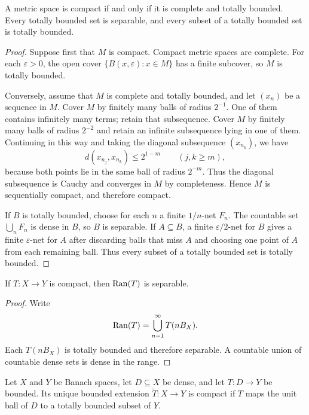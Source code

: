 \begin{notelemma}
A metric space is compact if and only if it is complete and totally bounded.
Every totally bounded set is separable, and every subset of a totally bounded
set is totally bounded.
\end{notelemma}

\begin{proof}
Suppose first that $M$ is compact.  Compact metric spaces are complete.  For
each $\varepsilon>0$, the open cover
\(
  \{B(x,\varepsilon):x\in M\}
\)
has a finite subcover, so $M$ is totally bounded.

Conversely, assume that $M$ is complete and totally bounded, and let
$(x_n)$ be a sequence in $M$.  Cover $M$ by finitely many balls of radius
$2^{-1}$.  One of them contains infinitely many terms; retain that
subsequence.  Cover $M$ by finitely many balls of radius $2^{-2}$ and retain
an infinite subsequence lying in one of them.  Continuing in this way and
taking the diagonal subsequence $(x_{n_k})$, we have
\[
  d(x_{n_j},x_{n_k})\le 2^{1-m}
  \qquad(j,k\ge m),
\]
because both points lie in the same ball of radius $2^{-m}$.  Thus the
diagonal subsequence is Cauchy and converges in $M$ by completeness.  Hence
$M$ is sequentially compact, and therefore compact.

If $B$ is totally bounded, choose for each $n$ a finite $1/n$-net $F_n$.
The countable set $\bigcup_nF_n$ is dense in $B$, so $B$ is separable.  If
$A\subseteq B$, a finite $\varepsilon/2$-net for $B$ gives a finite
$\varepsilon$-net for $A$ after discarding balls that miss $A$ and choosing
one point of $A$ from each remaining ball.  Thus every subset of a totally
bounded set is totally bounded.
\end{proof}

\begin{notetheorem}
If $T\colon X\to Y$ is compact, then $\operatorname{Ran}(T)$ is separable.
\end{notetheorem}

\begin{proof}
Write
\[
  \operatorname{Ran}(T)=\bigcup_{n=1}^{\infty}T(nB_X).
\]
Each $T(nB_X)$ is totally bounded and therefore separable.  A countable union
of countable dense sets is dense in the range.
\end{proof}

\begin{notetheorem}
Let $X$ and $Y$ be Banach spaces, let $D\subseteq X$ be dense, and let
$T\colon D\to Y$ be bounded.  Its unique bounded extension $\widetilde T\colon X\to Y$ is compact
if $T$ maps the unit ball of $D$ to a totally bounded subset of $Y$.
\end{notetheorem}

